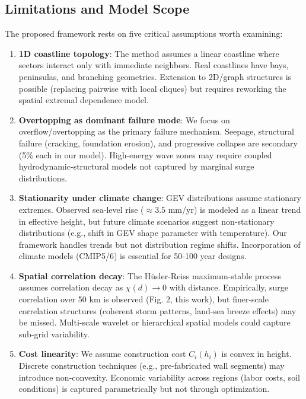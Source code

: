 \documentclass[review]{elsarticle}
\begin{document}
\subsection{Limitations and Model Scope}

The proposed framework rests on five critical assumptions worth examining:

\begin{enumerate}

\item \textbf{1D coastline topology}: The method assumes a linear coastline where sectors interact only with immediate neighbors. Real coastlines have bays, peninsulas, and branching geometries. Extension to 2D/graph structures is possible (replacing pairwise with local cliques) but requires reworking the spatial extremal dependence model.

\item \textbf{Overtopping as dominant failure mode}: We focus on overflow/overtopping as the primary failure mechanism. Seepage, structural failure (cracking, foundation erosion), and progressive collapse are secondary (5\% each in our model). High-energy wave zones may require coupled hydrodynamic-structural models not captured by marginal surge distributions.

\item \textbf{Stationarity under climate change}: GEV distributions assume stationary extremes. Observed sea-level rise ($\approx 3.5$ mm/yr) is modeled as a linear trend in effective height, but future climate scenarios suggest non-stationary distributions (e.g., shift in GEV shape parameter with temperature). Our framework handles trends but not distribution regime shifts. Incorporation of climate models (CMIP5/6) is essential for 50-100 year designs.

\item \textbf{Spatial correlation decay}: The Hüsler-Reiss maximum-stable process assumes correlation decay as $\chi(d) \to 0$ with distance. Empirically, surge correlation over 50 km is observed (Fig. 2, this work), but finer-scale correlation structures (coherent storm patterns, land-sea breeze effects) may be missed. Multi-scale wavelet or hierarchical spatial models could capture sub-grid variability.

\item \textbf{Cost linearity}: We assume construction cost $C_i(h_i)$ is convex in height. Discrete construction techniques (e.g., pre-fabricated wall segments) may introduce non-convexity. Economic variability across regions (labor costs, soil conditions) is captured parametrically but not through optimization.

\end{enumerate}
\end{document}
